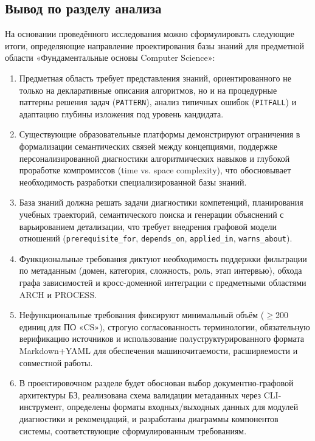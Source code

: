 \subsection{Вывод по разделу анализа}


На основании проведённого исследования можно сформулировать следующие итоги, определяющие направление проектирования базы знаний для предметной области «Фундаментальные основы Computer Science»:

\begin{enumerate}
    \item Предметная область требует представления знаний, ориентированного не только на декларативные описания алгоритмов, но и на процедурные паттерны решения задач (\texttt{PATTERN}), анализ типичных ошибок (\texttt{PITFALL}) и адаптацию глубины изложения под уровень кандидата.
    \item Существующие образовательные платформы демонстрируют ограничения в формализации семантических связей между концепциями, поддержке персонализированной диагностики алгоритмических навыков и глубокой проработке компромиссов (time vs. space complexity), что обосновывает необходимость разработки специализированной базы знаний.
    \item База знаний должна решать задачи диагностики компетенций, планирования учебных траекторий, семантического поиска и генерации объяснений с варьированием детализации, что требует внедрения графовой модели отношений (\texttt{prerequisite\_for}, \texttt{depends\_on}, \texttt{applied\_in}, \texttt{warns\_about}).
    \item Функциональные требования диктуют необходимость поддержки фильтрации по метаданным (домен, категория, сложность, роль, этап интервью), обхода графа зависимостей и кросс-доменной интеграции с предметными областями ARCH и PROCESS.
    \item Нефункциональные требования фиксируют минимальный объём ($\geq$200 единиц для ПО «CS»), строгую согласованность терминологии, обязательную верификацию источников и использование полуструктурированного формата Markdown+YAML для обеспечения машиночитаемости, расширяемости и совместной работы.
    \item В проектировочном разделе будет обоснован выбор документно-графовой архитектуры БЗ, реализована схема валидации метаданных через CLI-инструмент, определены форматы входных/выходных данных для модулей диагностики и рекомендаций, и разработаны диаграммы компонентов системы, соответствующие сформулированным требованиям.
\end{enumerate}